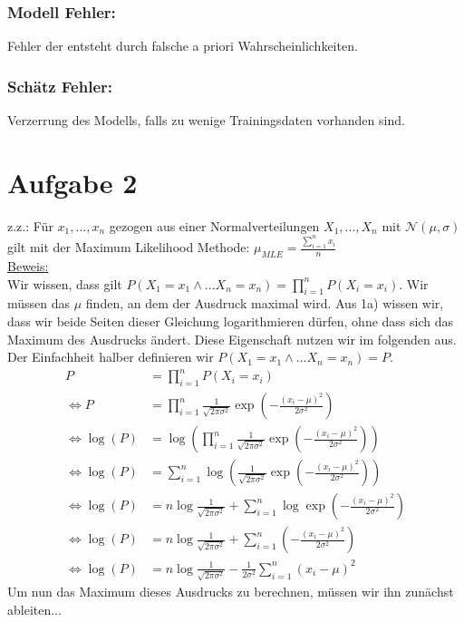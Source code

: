 \documentclass[a4paper]{scrartcl}
\begin{document}
\subsubsection*{Modell Fehler:}
Fehler der entsteht durch falsche a priori Wahrscheinlichkeiten.
\subsubsection*{Schätz Fehler:}
Verzerrung des Modells, falls zu wenige Trainingsdaten vorhanden sind.



\section*{Aufgabe 2}
z.z.: Für $x_1,...,x_n$ gezogen aus einer Normalverteilungen $X_1,...,X_n$ mit $\mathcal{N}(\mu, \sigma)$ gilt mit der Maximum Likelihood Methode: $\mu_{MLE} = \frac{\sum_{i=1}^{n} x_i}{n}$\\
\underline{Beweis:}\\
Wir wissen, dass gilt $P(X_1 = x_1 \wedge ... X_n = x_n) = \prod_{i=1}^n P(X_i = x_i)$. Wir müssen das $\mu$ finden, an dem der Ausdruck maximal wird. Aus 1a) wissen wir, dass wir beide Seiten dieser Gleichung logarithmieren dürfen, ohne dass sich das Maximum des Ausdrucks ändert. Diese Eigenschaft nutzen wir im folgenden aus. Der Einfachheit halber definieren wir $P(X_1 = x_1 \wedge ... X_n = x_n) = P$.
\begin{align*}
	P &= \prod_{i=1}^n P(X_i = x_i)\\
	\Leftrightarrow P &= \prod_{i=1}^n \frac{1}{\sqrt{2\pi \sigma^2}} \exp{(- \frac{(x_i-\mu)^2}{2\sigma^2})}\\
	\Leftrightarrow \log(P) &= \log(\prod_{i=1}^n \frac{1}{\sqrt{2\pi \sigma^2}} \exp{(- \frac{(x_i-\mu)^2}{2\sigma^2})})\\
	\Leftrightarrow \log(P) &= \sum_{i=1}^{n}\log( \frac{1}{\sqrt{2\pi \sigma^2}} \exp{(- \frac{(x_i-\mu)^2}{2\sigma^2})})\\
	\Leftrightarrow \log(P) &= n \log\frac{1}{\sqrt{2\pi \sigma^2}} + \sum_{i=1}^{n} \log\exp{(- \frac{(x_i-\mu)^2}{2\sigma^2})}\\
	\Leftrightarrow \log(P) &= n \log\frac{1}{\sqrt{2\pi \sigma^2}} + \sum_{i=1}^{n} (- \frac{(x_i-\mu)^2}{2\sigma^2})\\
	\Leftrightarrow \log(P) &= n \log\frac{1}{\sqrt{2\pi \sigma^2}} - \frac{1}{2\sigma^2}\sum_{i=1}^{n} (x_i-\mu)^2
\end{align*}
Um nun das Maximum dieses Ausdrucks zu berechnen, müssen wir ihn zunächst ableiten...
\end{document}
